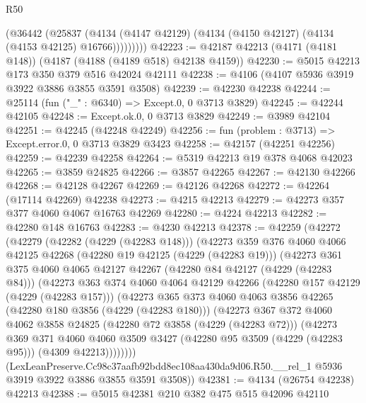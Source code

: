\begin{lexlean}{R50}
\begin{coremodule}
            (@36442
              (@25837
                (@4134 (@4147 @42129) (@4134 (@4150 @42127) (@4134 (@4153 @42125) @16766)))))))))
@42223 := @42187 @42213 (@4171 (@4181 @148)) (@4187 (@4188 (@4189 @518) @42138 @4159))
@42230 := @5015 @42213 @173 @350 @379 @516 @42024 @42111
@42238 := @4106 (@4107 @5936 @3919 @3922 @3886 @3855 @3591 @3508)
@42239 := @42230 @42238
@42244 := @25114 (fun ("_" : @6340) => Except.{0, 0} @3713 @3829)
@42245 := @42244 @42105
@42248 := Except.ok.{0, 0} @3713 @3829
@42249 := @3989 @42104
@42251 := @42245 (@42248 @42249)
@42256 := fun (problem : @3713) => Except.error.{0, 0} @3713 @3829 @3423
@42258 := @42157 (@42251 @42256)
@42259 := @42239 @42258
@42264 := @5319 @42213 @19 @378 @4068 @42023
@42265 := @3859 @24825
@42266 := @3857 @42265
@42267 := @42130 @42266
@42268 := @42128 @42267
@42269 := @42126 @42268
@42272 := @42264 (@17114 @42269) @42238
@42273 := @4215 @42213
@42279 := @42273 @357 @377 @4060 @4067 @16763 @42269
@42280 := @4224 @42213
@42282 := @42280 @148 @16763
@42283 := @4230 @42213
@42378 := @42259
    (@42272
      (@42279
        (@42282 (@4229 (@42283 @148)))
        (@42273
          @359
          @376
          @4060
          @4066
          @42125
          @42268
          (@42280 @19 @42125 (@4229 (@42283 @19)))
          (@42273
            @361
            @375
            @4060
            @4065
            @42127
            @42267
            (@42280 @84 @42127 (@4229 (@42283 @84)))
            (@42273
              @363
              @374
              @4060
              @4064
              @42129
              @42266
              (@42280 @157 @42129 (@4229 (@42283 @157)))
              (@42273
                @365
                @373
                @4060
                @4063
                @3856
                @42265
                (@42280 @180 @3856 (@4229 (@42283 @180)))
                (@42273
                  @367
                  @372
                  @4060
                  @4062
                  @3858
                  @24825
                  (@42280 @72 @3858 (@4229 (@42283 @72)))
                  (@42273
                    @369
                    @371
                    @4060
                    @4060
                    @3509
                    @3427
                    (@42280 @95 @3509 (@4229 (@42283 @95)))
                    (@4309 @42213))))))))
      (LexLeanPreserve.Cc98c37aafb92bdd8ec108aa430da9d06.R50.__rel_1
        @5936
        @3919
        @3922
        @3886
        @3855
        @3591
        @3508))
@42381 := @4134 (@26754 @42238) @42213
@42388 := @5015 @42381 @210 @382 @475 @515 @42096 @42110

\end{coremodule}
\end{lexlean}

